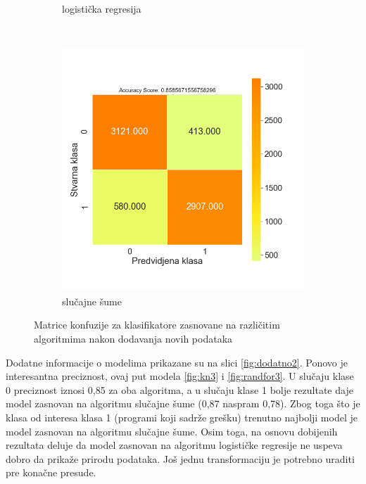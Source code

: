 \documentclass[12pt,oneside]{memoir}
\begin{document}
\begin{figure}[!ht]
\begin{subfigure}[b]{0.45\textwidth}
        \caption{logistička regresija}
        \label{fig:logreg2}
    \end{subfigure}
    \\
    \begin{subfigure}[b]{0.45\textwidth}
        \centering
        \includegraphics[width=\textwidth]{RF_oversampled_confussion_matrix}
        \caption{slučajne šume}
        \label{fig:randfor2}
    \end{subfigure}
    \caption{Matrice konfuzije za klasifikatore zasnovane na različitim algoritmima nakon dodavanja novih podataka}
    \label{fig:confmatrovers}
\end{figure}

Dodatne informacije o modelima prikazane su na slici \ref{fig:dodatno2}. Ponovo je interesantna preciznost, ovaj put modela \ref{fig:kn3} i \ref{fig:randfor3}. U slučaju klase 0 preciznost iznosi 0,85 za oba algoritma, a u slučaju klase 1 bolje rezultate daje model zasnovan na algoritmu slučajne šume (0,87 naspram 0,78). Zbog toga što je klasa od interesa klasa 1 (programi koji sadrže grešku) trenutno najbolji model je model zasnovan na algoritmu slučajne šume. Osim toga, na osnovu dobijenih rezultata deluje da model zasnovan na algoritmu logističke regresije ne uspeva dobro da prikaže prirodu podataka. Još jednu transformaciju je potrebno uraditi pre konačne presude.
\end{document}
